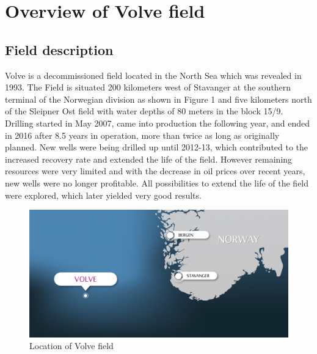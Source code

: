 \documentclass[12pt,a4paper]{report}
\begin{document}
\chapter{Overview of Volve field}
\section{Field description}
Volve is a decommissioned field located in the North Sea which was revealed in 1993. The Field is situated 200 kilometers west of Stavanger at the southern terminal of the Norwegian division as shown in Figure 1 and five kilometers north of the Sleipner Ost field with water depths of 80 meters in the block 15/9. Drilling started in May 2007, came into production the following year, and ended in 2016 after 8.5 years in operation, more than twice as long as originally planned. New wells were being drilled up until 2012-13, which contributed to the increased recovery rate and extended the life of the field. However remaining resources were very limited and with the decrease in oil prices over recent years, new wells were no longer profitable. All possibilities to extend the life of the field were explored, which later yielded very good results.
\begin{figure}[H]
\centering
\includegraphics[scale = 0.5]{Volve/volve}
\caption{Location of Volve field}
\end{figure}
\end{document}
